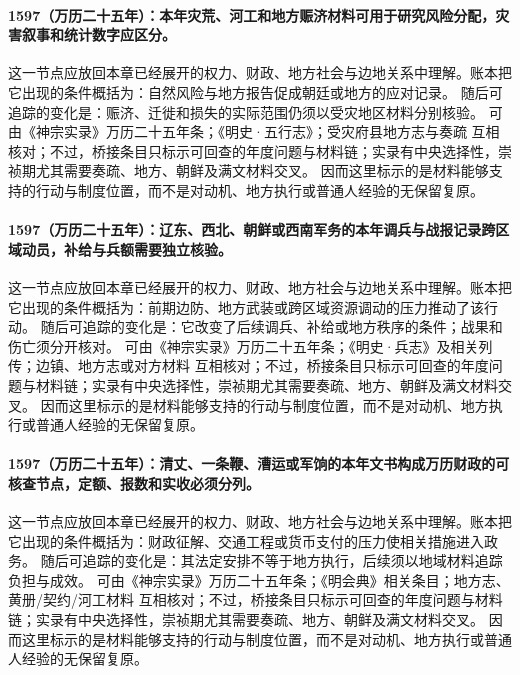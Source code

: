 \paragraph{1597（万历二十五年）：本年灾荒、河工和地方赈济材料可用于研究风险分配，灾害叙事和统计数字应区分。} 这一节点应放回本章已经展开的权力、财政、地方社会与边地关系中理解。账本把它出现的条件概括为：自然风险与地方报告促成朝廷或地方的应对记录。 随后可追踪的变化是：赈济、迁徙和损失的实际范围仍须以受灾地区材料分别核验。 可由《神宗实录》万历二十五年条；《明史·五行志》；受灾府县地方志与奏疏 互相核对；不过，桥接条目只标示可回查的年度问题与材料链；实录有中央选择性，崇祯期尤其需要奏疏、地方、朝鲜及满文材料交叉。 因而这里标示的是材料能够支持的行动与制度位置，而不是对动机、地方执行或普通人经验的无保留复原。

\paragraph{1597（万历二十五年）：辽东、西北、朝鲜或西南军务的本年调兵与战报记录跨区域动员，补给与兵额需要独立核验。} 这一节点应放回本章已经展开的权力、财政、地方社会与边地关系中理解。账本把它出现的条件概括为：前期边防、地方武装或跨区域资源调动的压力推动了该行动。 随后可追踪的变化是：它改变了后续调兵、补给或地方秩序的条件；战果和伤亡须分开核对。 可由《神宗实录》万历二十五年条；《明史·兵志》及相关列传；边镇、地方志或对方材料 互相核对；不过，桥接条目只标示可回查的年度问题与材料链；实录有中央选择性，崇祯期尤其需要奏疏、地方、朝鲜及满文材料交叉。 因而这里标示的是材料能够支持的行动与制度位置，而不是对动机、地方执行或普通人经验的无保留复原。

\paragraph{1597（万历二十五年）：清丈、一条鞭、漕运或军饷的本年文书构成万历财政的可核查节点，定额、报数和实收必须分列。} 这一节点应放回本章已经展开的权力、财政、地方社会与边地关系中理解。账本把它出现的条件概括为：财政征解、交通工程或货币支付的压力使相关措施进入政务。 随后可追踪的变化是：其法定安排不等于地方执行，后续须以地域材料追踪负担与成效。 可由《神宗实录》万历二十五年条；《明会典》相关条目；地方志、黄册/契约/河工材料 互相核对；不过，桥接条目只标示可回查的年度问题与材料链；实录有中央选择性，崇祯期尤其需要奏疏、地方、朝鲜及满文材料交叉。 因而这里标示的是材料能够支持的行动与制度位置，而不是对动机、地方执行或普通人经验的无保留复原。

